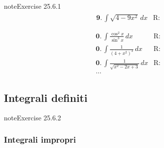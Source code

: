 \documentclass[letterpaper,10pt,italian]{jupyterBook}
\begin{document}
\begin{sphinxadmonition}{note}{Exercise 25.6.1}
\begin{equation*}
\begin{split}
\begin{aligned}
 & \mathbf{9.} \,  \int \sqrt{4 - 9 x^2} \, dx & \text{R: } \\
\end{aligned}\end{split}
\end{equation*}\begin{equation*}
\begin{split}\begin{aligned}
 & \mathbf{0.} \,  \int \frac{\cos^2 x}{\sin^3 x} \, dx & \text{R: } \\
 & \mathbf{0.} \,  \int \frac{1}{(4+x^2)^3} \, dx & \text{R: } \\
 & \mathbf{0.} \,  \int \frac{1}{\sqrt{x^2 - 2x + 3}} \, dx & \text{R: } \\
 & \dots
\end{aligned}\end{split}
\end{equation*}\end{sphinxadmonition}


\subsection{Integrali definiti}
\label{\detokenize{ch/infinitesimal_calculus/integrals-problems:integrali-definiti}} \label{exercise:ch/infinitesimal_calculus/integrals-problems-exercise-1}

\begin{sphinxadmonition}{note}{Exercise 25.6.2}



\sphinxAtStartPar
{}
\end{sphinxadmonition}


\subsubsection{Integrali impropri}
\label{\detokenize{ch/infinitesimal_calculus/integrals-problems:integrali-impropri}} \label{exercise:ch/infinitesimal_calculus/integrals-problems-exercise-2}
\end{document}
